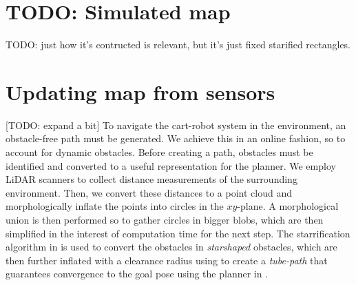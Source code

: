 \section{TODO: Simulated map}
TODO: just how it's contructed is relevant, but it's just fixed starified rectangles.


\section{Updating map from sensors}
[TODO: expand a bit]
To navigate the cart-robot system in the environment, an obstacle-free path
must be generated. We achieve this in an online fashion, so to account for
dynamic obstacles. Before creating a path, obstacles must be identified and
converted to a useful representation for the planner. We employ LiDAR scanners
to collect distance measurements of the surrounding environment. Then, we
convert these distances to a point cloud and morphologically inflate the points
into circles in the $xy$-plane. A morphological union is then performed so to
gather circles in bigger blobs, which are then simplified in the interest of
computation time for the next step. The starrification algorithm in
\lorem{[Dahlin]} is used to convert the obstacles in \textit{starshaped}
obstacles, which are then further inflated with a clearance radius using
\lorem{[Dahlin]} to create a \textit{tube-path} that guarantees convergence to
the goal pose using the planner in \lorem{[Huber]}.

